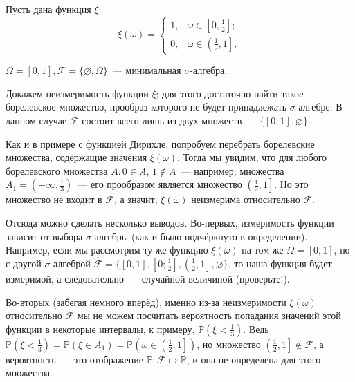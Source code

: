 \begin{exmp} Пусть дана функция $\xi$:
\begin{equation*}
    \xi(\omega) = 
    \begin{cases}
        1, & \omega \in \left[0, \frac{1}{2}\right]; \\
        0, & \omega \in \left(\frac{1}{2}, 1\right],
    \end{cases}
\end{equation*}

$\Omega = [0, 1], \mathcal{F} = \{\varnothing, \Omega\}$~--- минимальная ${\sigma \text{-алгебра}}$.  

Докажем неизмеримость функции $\xi$; для этого достаточно найти такое борелевское множество, прообраз которого не будет принадлежать ${\sigma \text{-алгебре}}$. 
В данном случае $\mathcal{F}$ состоит всего лишь из двух множеств~--- $\{[0, 1], \varnothing\}$.

Как и в примере с функцией Дирихле, попробуем перебрать борелевские множества, содержащие значения $\xi(\omega)$. 
Тогда мы увидим, что для любого борелевского множества $A \colon 0 \in A, \, 1 \notin A$~--- например, множества ${A_1 = \left(-\infty, \frac{1}{3}\right)}$~--- его прообразом является множество $\left(\frac{1}{2}, 1\right]$. 
Но это множество не входит в $\mathcal{F}$, а значит, $\xi(\omega)$ неизмерима относительно $\mathcal{F}$.

Отсюда можно сделать несколько выводов. 
Во-первых, измеримость функции зависит от выбора ${\sigma \text{-алгебры}}$ (как и было подчёркнуто в определении). 
Например, если мы рассмотрим ту же функцию $\xi(\omega)$ на том же $\Omega = [0, 1]$, 
но с другой $\sigma$-алгеброй ${\widehat{\mathcal{F}} = \{[0, 1], \left[0; \frac{1}{2}\right], \left(\frac{1}{2}, 1\right], \varnothing\}}$, 
то наша функция будет измеримой, а следовательно~--- случайной величиной (проверьте!).

Во-вторых (забегая немного вперёд), именно из-за неизмеримости $\xi(\omega)$ относительно $\mathcal{F}$ мы не можем посчитать вероятность попадания значений этой функции в некоторые интервалы, к примеру, $\mathbb{P}\left({\xi < \frac{1}{3}}\right)$. 
Ведь $\mathbb{P}\left( \xi < \frac{1}{3} \right) = \mathbb{P}\left(\xi \in A_1\right) = \mathbb{P}\left(\omega \in \left(\frac{1}{2}, 1\right] \right)$, но множество $\left(\frac{1}{2}, 1\right] \notin \mathcal{F}$, 
а вероятность~--- это отображение $\mathbb{P}: \mathcal{F} \mapsto \mathbb{R}$, и она не определена для этого множества.
\end{exmp} 

